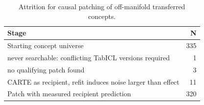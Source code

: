 %
%

\begin{table}[t]
\centering
\caption{Attrition for causal patching of off-manifold transferred concepts.}
\label{tab:patch_attrition}
\small
\begin{tabular}{lr}
\toprule
Stage & N \\
\midrule
Starting concept universe & 335 \\
never searchable: conflicting TabICL versions required & 1 \\
no qualifying patch found & 3 \\
CARTE as recipient, refit induces noise larger than effect & 11 \\
Patch with measured recipient prediction & 320 \\
\bottomrule
\end{tabular}
\end{table}

